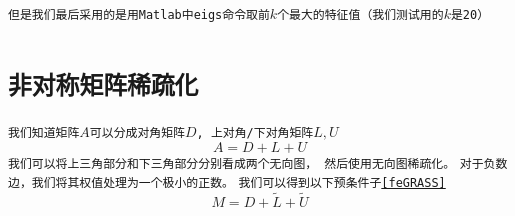 \documentclass[11pt, a4paper]{article}
\theoremstyle{plain}
\theoremstyle{plain}
\theoremstyle{plain}
\theoremstyle{definition}
\theoremstyle{remark}
\theoremstyle{definition}
\newcommand{\T}[1]{\texttt{#1}}
\begin{document}
\T{但是我们最后采用的是用Matlab中eigs命令取前$k$个最大的特征值（我们测试用的$k$是20）}


\section{\T{非对称矩阵稀疏化}}
\T{我们知道矩阵$A$可以分成对角矩阵$D$, 上对角/下对角矩阵$L, U$}
\begin{equation}
	A = D + L + U
\end{equation}
\T{我们可以将上三角部分和下三角部分分别看成两个无向图， 然后使用无向图稀疏化\cite{Sparse}。}
\T{对于负数边，我们将其权值处理为一个极小的正数。}
\T{我们可以得到以下预条件子\ref{feGRASS}}
\begin{equation}
	\label{feGRASS}
	\tag{feGRASS预条件子}
	M = D + \tilde{L} + \tilde{U}
\end{equation}
\end{document}
